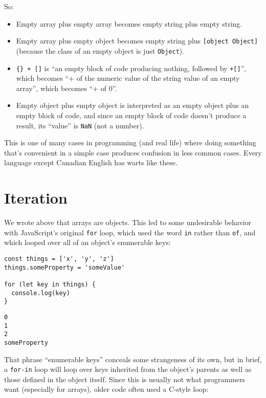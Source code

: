 \noindent
So:

\begin{itemize}
\item
  Empty array plus empty array becomes empty string plus empty string.
\item
  Empty array plus empty object becomes empty string plus \texttt{[object\ Object]}
  (because the class of an empty object is just \texttt{Object}).
\item
  \texttt{\{\}\ +\ []} is ``an empty block of code producing nothing, followed by \texttt{+[]}'',
  which becomes ``+ of the numeric value of the string value of an empty array'',
  which becomes ``+ of 0''.
\item
  Empty object plus empty object is interpreted as an empty object plus an empty block of code,
  and since an empty block of code doesn't produce a result,
  its ``value'' is \texttt{NaN} (not a number).
\end{itemize}

This is one of many cases in programming (and real life) where
doing something that's convenient in a simple case
produces confusion in less common cases.
Every language except Canadian English has warts like these.

\section{Iteration}\label{s:legacy-iteration}

We wrote above that arrays are objects.
This led to some undesirable behavior with JavaScript's original \texttt{for} loop,
which used the word \texttt{in} rather than \texttt{of},
and which looped over all of an object's enumerable keys:

\begin{verbatim}
const things = ['x', 'y', 'z']
things.someProperty = 'someValue'

for (let key in things) {
  console.log(key)
}
\end{verbatim}

\begin{verbatim}
0
1
2
someProperty
\end{verbatim}

That phrase ``enumerable keys'' conceals some strangeness of its own,
but in brief,
a \texttt{for-in} loop will loop over keys inherited from the object's parents
as well as those defined in the object itself.
Since this is usually not what programmers want (especially for arrays),
older code often used a C-style loop:

